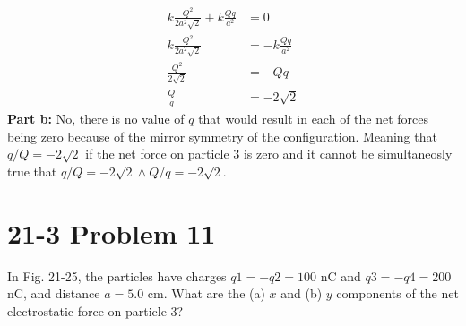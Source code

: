 \documentclass{article}
\begin{document}
\begin{align*}
    k \frac{Q^2}{2a^2\sqrt{2}} + k \frac{Qq}{a^2} &= 0 \\
    k \frac{Q^2}{2a^2\sqrt{2}} &= - k \frac{Qq}{a^2} \\
    \frac{Q^2}{2\sqrt{2}} &= - Qq \\
    \frac{Q}{q} &= \boxed{- 2 \sqrt{2}}
\end{align*}
\textbf{Part b:} No, there is no value of $q$ that would result in each of the net forces being zero because of the mirror symmetry of the configuration. 
Meaning that $q/Q = -2\sqrt{2}$ if the net force on particle 3 is zero and it cannot be simultaneosly true that $q/Q = -2\sqrt{2} \wedge Q/q = -2\sqrt{2}$.

\section*{21-3 Problem 11}
In Fig. 21-25, the particles have charges $q1 = -q2 = 100$ nC and $q3 = -q4 = 200$ nC, and distance $a = 5.0$ cm. 
What are the (a) $x$ and (b) $y$ components of the net electrostatic force on particle 3?
\end{document}
